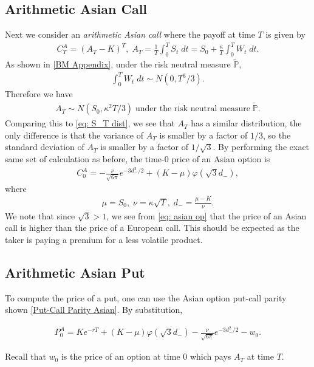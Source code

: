 \documentclass[reqno]{amsart}
\begin{document}
\subsection{Arithmetic Asian Call}
Next we consider an \emph{arithmetic Asian call} where the payoff at time $T$ is given by 
\begin{align} \label{eq: asian}
	 C^A_T = (A_T - K)^T, \; A_T = \frac{1}{T}\int_0^T S_t \; dt = S_0 + \frac{\kappa}{T} \int_0^T W_t \; dt. 
\end{align}
As shown in \eqref{BM Appendix}, under the risk neutral measure $\tilde{\mathbb{P}}$, 
\begin{align}
	 \int_0^T W_t \; dt \sim N(0, T^3/3).
\end{align}
Therefore we have 
\begin{align}
	 A_T \sim N(S_0, \kappa^2 T/3) \; \text{under the risk neutral measure} \; \tilde{\mathbb{P}}.
\end{align}
Comparing this to \eqref{eq: S_T dist}, we see that $A_T$ has a similar distribution, the only difference is that the variance of $A_T$ is smaller by a factor of $1/3$, so the standard deviation of $A_T$ is smaller by a factor of $1/\sqrt{3}$. By performing the exact same set of calculation as before, the time-0 price of an Asian option is 
\begin{align} \label{eq: asian op}
	 C^A_0 = -\frac{\nu}{\sqrt{6\pi}} e^{-3d_-^2/2} + (K-\mu) \varphi(\sqrt{3}d_-),
\end{align}
where 
\begin{align}
	 \mu = S_0, \; \nu = \kappa \sqrt{T}, \; d_- = \frac{\mu - K}{\nu}.
\end{align}
We note that since $\sqrt{3} > 1$, we see from \eqref{eq: asian op} that the price of an Asian call is higher than the price of a European call. This should be expected as the taker is paying a premium for a less volatile product. 


\subsection{Arithmetic Asian Put}
To compute the price of a put, one can use the Asian option put-call parity shown \eqref{Put-Call Parity Asian}. By substitution, 

\begin{align}
     P^A_0 = Ke^{-rT} + (K-\mu) \varphi(\sqrt{3}d_-) - \frac{\nu}{\sqrt{6\pi}} e^{-3d_-^2/2} - w_0.
\end{align}

Recall that $w_0$ is the price of an option at time 0 which pays $A_T$ at time $T$.
\end{document}
